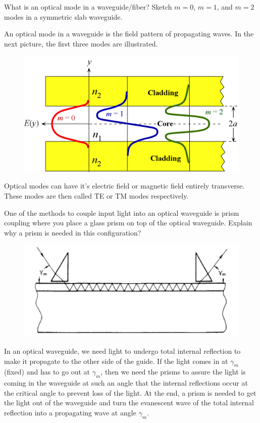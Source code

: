 \documentclass[answers, addpoints]{exam} %
\begin{document}
\begin{questions}
\begin{parts}
  \end{parts}

	\question[5] What is an optical mode in a waveguide/fiber? Sketch $m=0$, $m=1$, and $m=2$ modes in a symmetric slab waveguide.
	\begin{solution}
		An optical mode in a waveguide is the field pattern of propagating waves.
		In the next picture, the first three modes are illustrated.
		\begin{figure}[H]
			\centering
			\includegraphics[scale=.5]{figures/wgmodes}
		\end{figure}
		Optical modes can have it's electric field or magnetic field entirely transverse.
		These modes are then called TE or TM modes respectively.
	\end{solution}

	\question[5] One of the methods to couple input light into an optical waveguide is prism coupling where you place a glass prism on top of the optical waveguide. Explain why a prism is needed in this configuration?
	\begin{figure}[H]
		\centering
		\includegraphics[scale=1]{figures/prismcoupling}
	\end{figure}
	\begin{solution}
		In an optical waveguide, we need light to undergo total internal reflection to make it propagate to the other side of the guide.
		If the light comes in at $\gamma_m$ (fixed) and has to go out at $\gamma_m$, then we need the prisms to assure the light is coming in the waveguide at such an angle that the internal reflections occur at the critical angle to prevent loss of the light.
		At the end, a prism is needed to get the light out of the waveguide and turn the evanescent wave of the total internal reflection into a propagating wave at angle $\gamma_m$.
		

\end{solution}
\end{questions}
\end{document}
